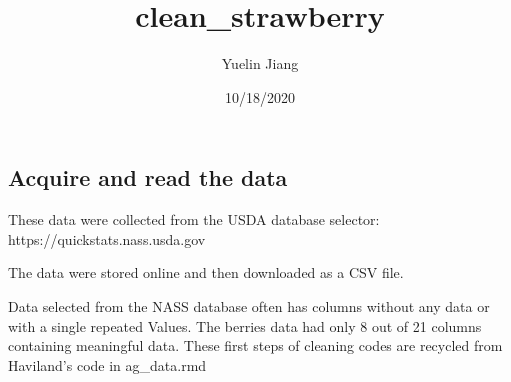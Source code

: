 \documentclass[
]{article}
\title{clean\_strawberry}
\author{Yuelin Jiang}
\date{10/18/2020}
\newenvironment{Shaded}{\begin{snugshade}}{\end{snugshade}}
\newcommand{\CommentTok}[1]{\textcolor[rgb]{0.56,0.35,0.01}{\textit{#1}}}
\newcommand{\DataTypeTok}[1]{\textcolor[rgb]{0.13,0.29,0.53}{#1}}
\newcommand{\DecValTok}[1]{\textcolor[rgb]{0.00,0.00,0.81}{#1}}
\newcommand{\KeywordTok}[1]{\textcolor[rgb]{0.13,0.29,0.53}{\textbf{#1}}}
\newcommand{\NormalTok}[1]{#1}
\newcommand{\OperatorTok}[1]{\textcolor[rgb]{0.81,0.36,0.00}{\textbf{#1}}}
\newcommand{\StringTok}[1]{\textcolor[rgb]{0.31,0.60,0.02}{#1}}
\begin{document}
\maketitle

\hypertarget{acquire-and-read-the-data}{%
\subsection{Acquire and read the data}\label{acquire-and-read-the-data}}

These data were collected from the USDA database selector:
https://quickstats.nass.usda.gov

The data were stored online and then downloaded as a CSV file.

Data selected from the NASS database often has columns without any data
or with a single repeated Values. The berries data had only 8 out of 21
columns containing meaningful data. These first steps of cleaning codes
are recycled from Haviland's code in ag\_data.rmd

\begin{Shaded}
\end{Shaded}
\end{document}
